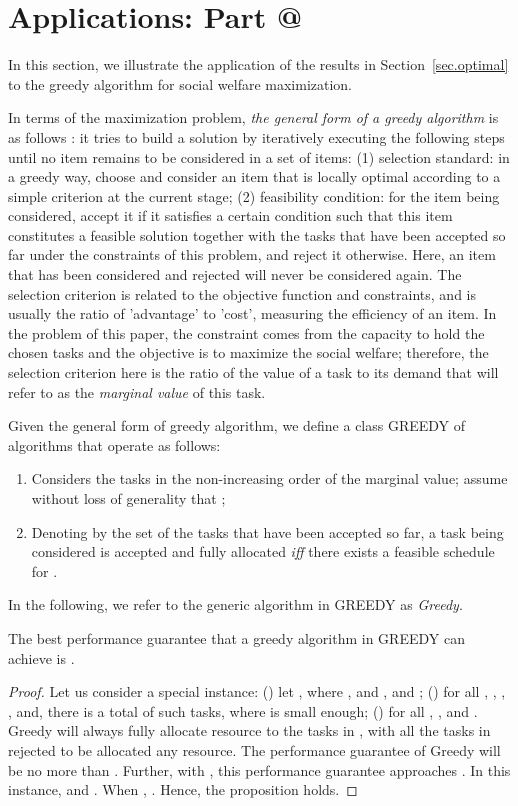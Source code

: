 \documentclass[10pt,journal,compsoc]{IEEEtran}
\makeatletter
\newcommand{\rmnum}[1]{\romannumeral #1}
\newcommand{\Rmnum}[1]{\expandafter\@slowromancap\romannumeral #1@}
\makeatother
\begin{document}
\section{Applications: Part \Rmnum{1}}
\label{more-application}


In this section, we illustrate the application of the results in Section~\ref{sec.optimal} to the greedy algorithm for social welfare maximization.




In terms of the maximization problem, {\em the general form of a greedy algorithm} is as follows \cite{Brassard,Even}: it tries to build a solution by iteratively executing the following steps until no item remains to be considered in a set of items: (1) selection standard: in a greedy way, choose and consider an item that is locally optimal according to a simple criterion at the current stage; (2) feasibility condition: for the item being considered, accept it if it satisfies a certain condition such that this item constitutes a feasible solution together with the tasks that have been accepted so far under the constraints of this problem, and reject it otherwise. Here, an item that has been considered and rejected will never be considered again. The selection criterion is related to the objective function and constraints, and is usually the ratio of 'advantage' to 'cost', measuring the efficiency of an item. In the problem of this paper, the constraint comes from the capacity to hold the chosen tasks and the objective is to maximize the social welfare; therefore, the selection criterion here is the ratio of the value of a task to its demand that will refer to as the {\em marginal value} of this task.

Given the general form of greedy algorithm, we define a class GREEDY of algorithms that operate as follows:
\begin{enumerate}
  \item Considers the tasks in the non-increasing order of the marginal value; assume without loss of generality that ;
  \item Denoting by  the set of the tasks that have been accepted so far, a task  being considered is accepted and fully allocated {\em iff} there exists a feasible schedule for .
\end{enumerate}
In the following, we refer to the generic algorithm in GREEDY as {\em Greedy}.


\begin{proposition}\label{bound-greedy}
The best performance guarantee that a greedy algorithm in GREEDY can achieve is .
\end{proposition}
\begin{proof}
Let us consider a special instance: (\rmnum{1}) let , where ,  and , and ; (\rmnum{2}) for all , , ,
, and, there is a total of  such tasks, where  is small enough; (\rmnum{3}) for all , ,  and . Greedy will always fully allocate resource to the tasks in , with all the tasks in  rejected to be allocated any resource. The performance guarantee of Greedy will be no more than . Further, with , this performance guarantee approaches . In this instance,  and . When , . Hence, the proposition holds.
\end{proof}
\end{document}
